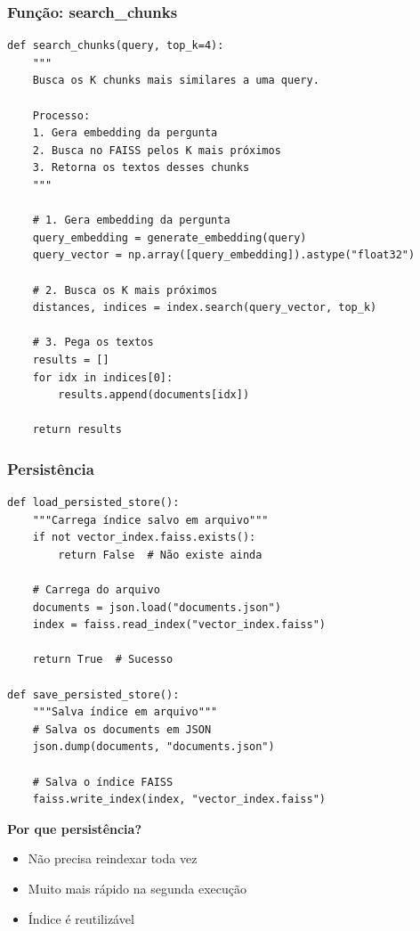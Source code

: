 \documentclass[12pt,a4paper]{article}
\begin{document}
\subsubsection{Função: search\_chunks}

\begin{lstlisting}
def search_chunks(query, top_k=4):
    """
    Busca os K chunks mais similares a uma query.
    
    Processo:
    1. Gera embedding da pergunta
    2. Busca no FAISS pelos K mais próximos
    3. Retorna os textos desses chunks
    """
    
    # 1. Gera embedding da pergunta
    query_embedding = generate_embedding(query)
    query_vector = np.array([query_embedding]).astype("float32")
    
    # 2. Busca os K mais próximos
    distances, indices = index.search(query_vector, top_k)
    
    # 3. Pega os textos
    results = []
    for idx in indices[0]:
        results.append(documents[idx])
    
    return results
\end{lstlisting}

\subsubsection{Persistência}

\begin{lstlisting}
def load_persisted_store():
    """Carrega índice salvo em arquivo"""
    if not vector_index.faiss.exists():
        return False  # Não existe ainda
    
    # Carrega do arquivo
    documents = json.load("documents.json")
    index = faiss.read_index("vector_index.faiss")
    
    return True  # Sucesso

def save_persisted_store():
    """Salva índice em arquivo"""
    # Salva os documents em JSON
    json.dump(documents, "documents.json")
    
    # Salva o índice FAISS
    faiss.write_index(index, "vector_index.faiss")
\end{lstlisting}

\textbf{Por que persistência?}
\begin{itemize}
    \item Não precisa reindexar toda vez
    \item Muito mais rápido na segunda execução
    \item Índice é reutilizável
\end{itemize}
\end{document}
